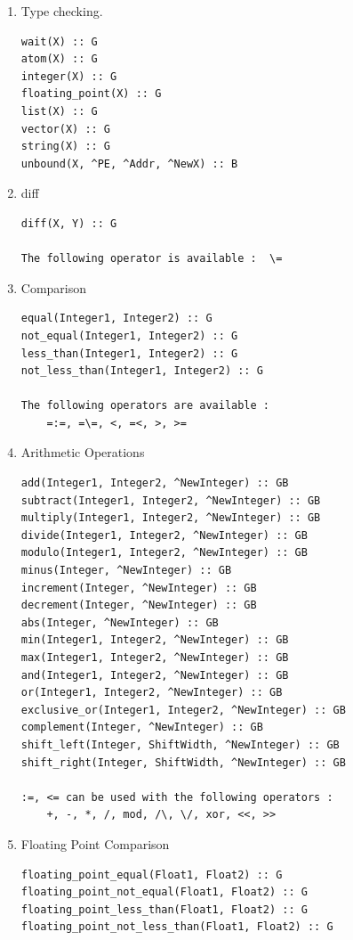 \newpage
{}
\begin{enumerate}

\item Type checking.
\begin{verbatim}
wait(X) :: G
atom(X) :: G
integer(X) :: G
floating_point(X) :: G
list(X) :: G
vector(X) :: G
string(X) :: G
unbound(X, ^PE, ^Addr, ^NewX) :: B

\end{verbatim}
\item diff
\begin{verbatim}
diff(X, Y) :: G

The following operator is available :  \=

\end{verbatim}
\item Comparison
\begin{verbatim}
equal(Integer1, Integer2) :: G
not_equal(Integer1, Integer2) :: G
less_than(Integer1, Integer2) :: G
not_less_than(Integer1, Integer2) :: G

The following operators are available :
    =:=, =\=, <, =<, >, >=

\end{verbatim}    
\item Arithmetic Operations
\begin{verbatim}
add(Integer1, Integer2, ^NewInteger) :: GB
subtract(Integer1, Integer2, ^NewInteger) :: GB
multiply(Integer1, Integer2, ^NewInteger) :: GB
divide(Integer1, Integer2, ^NewInteger) :: GB
modulo(Integer1, Integer2, ^NewInteger) :: GB
minus(Integer, ^NewInteger) :: GB
increment(Integer, ^NewInteger) :: GB
decrement(Integer, ^NewInteger) :: GB
abs(Integer, ^NewInteger) :: GB
min(Integer1, Integer2, ^NewInteger) :: GB
max(Integer1, Integer2, ^NewInteger) :: GB
and(Integer1, Integer2, ^NewInteger) :: GB
or(Integer1, Integer2, ^NewInteger) :: GB
exclusive_or(Integer1, Integer2, ^NewInteger) :: GB
complement(Integer, ^NewInteger) :: GB
shift_left(Integer, ShiftWidth, ^NewInteger) :: GB
shift_right(Integer, ShiftWidth, ^NewInteger) :: GB

:=, <= can be used with the following operators :
    +, -, *, /, mod, /\, \/, xor, <<, >>

\end{verbatim}
\item Floating Point Comparison
\begin{verbatim}
floating_point_equal(Float1, Float2) :: G
floating_point_not_equal(Float1, Float2) :: G
floating_point_less_than(Float1, Float2) :: G
floating_point_not_less_than(Float1, Float2) :: G


\end{verbatim}
\end{enumerate}
